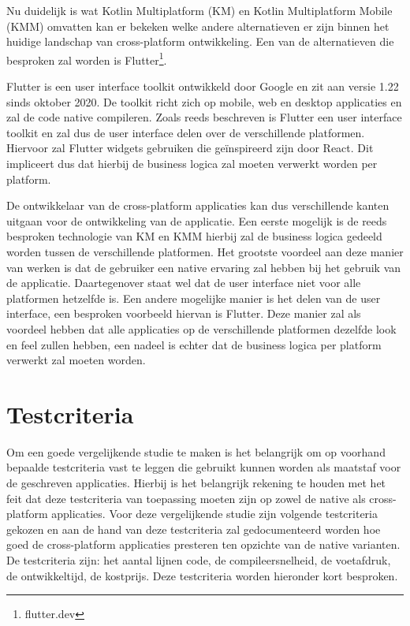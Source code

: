 Nu duidelijk is wat Kotlin Multiplatform (KM) en Kotlin Multiplatform Mobile (KMM) omvatten kan er bekeken welke andere alternatieven er zijn binnen het huidige landschap van cross-platform ontwikkeling. Een van de alternatieven die besproken zal worden is Flutter\footnote{flutter.dev}.

Flutter is een user interface toolkit ontwikkeld door Google en zit aan versie 1.22 sinds oktober 2020.\autocite{Sells2020} De toolkit richt zich op mobile, web en desktop applicaties en zal de code native compileren. Zoals reeds beschreven is Flutter een user interface toolkit en zal dus de user interface delen over de verschillende platformen. Hiervoor zal Flutter widgets gebruiken die geïnspireerd zijn door React.\autocite{FlutterWidgets} Dit impliceert dus dat hierbij de business logica zal moeten verwerkt worden per platform.

De ontwikkelaar van de cross-platform applicaties kan dus verschillende kanten uitgaan voor de ontwikkeling van de applicatie. Een eerste mogelijk is de reeds besproken technologie van KM en KMM hierbij zal de business logica gedeeld worden tussen de verschillende platformen. Het grootste voordeel aan deze manier van werken is dat de gebruiker een native ervaring zal hebben bij het gebruik van de applicatie. Daartegenover staat wel dat de user interface niet voor alle platformen hetzelfde is. Een andere mogelijke manier is het delen van de user interface, een besproken voorbeeld hiervan is Flutter. Deze manier zal als voordeel hebben dat alle applicaties op de verschillende platformen dezelfde look en feel zullen hebben, een nadeel is echter dat de business logica per platform verwerkt zal moeten worden.

\section{Testcriteria}
\label{sec:SVZtestcriteria}



Om een goede vergelijkende studie te maken is het belangrijk om op voorhand bepaalde testcriteria vast te leggen die gebruikt kunnen worden als maatstaf voor de geschreven applicaties. Hierbij is het belangrijk rekening te houden met het feit dat deze testcriteria van toepassing moeten zijn op zowel de native als cross-platform applicaties. Voor deze vergelijkende studie zijn volgende testcriteria gekozen en aan de hand van deze testcriteria zal gedocumenteerd worden hoe goed de cross-platform applicaties presteren ten opzichte van de native varianten. De testcriteria zijn: het aantal lijnen code, de compileersnelheid, de voetafdruk, de ontwikkeltijd,  de kostprijs. Deze testcriteria worden hieronder kort besproken. 

